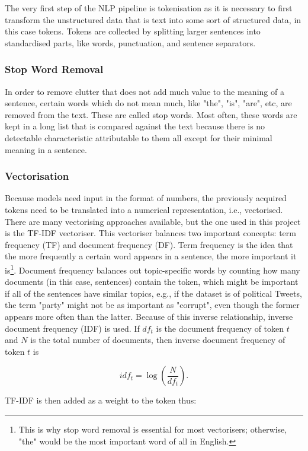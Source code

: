 \documentclass{l4proj}
\begin{document}
The very first step of the NLP pipeline is tokenisation as it is necessary to first transform the unstructured data that is text into some sort of structured data, in this case tokens. Tokens are collected by splitting larger sentences into standardised parts, like words, punctuation, and sentence separators.

\subsubsection{Stop Word Removal}

In order to remove clutter that does not add much value to the meaning of a sentence, certain words which do not mean much, like "the", "is", "are", etc, are removed from the text. These are called stop words. Most often, these words are kept in a long list that is compared against the text because there is no detectable characteristic attributable to them all except for their minimal meaning in a sentence.

\subsubsection{Vectorisation}

Because models need input in the format of numbers, the previously acquired tokens need to be translated into a numerical representation, i.e., vectorised. There are many vectorising approaches available, but the one used in this project is the TF-IDF vectoriser. This vectoriser balances two important concepts: term frequency (TF) and document frequency (DF). Term frequency is the idea that the more frequently a certain word appears in a sentence, the more important it is\footnote{This is why stop word removal is essential for most vectorisers; otherwise, "the" would be the most important word of all in English.}. Document frequency balances out topic-specific words by counting how many documents (in this case, sentences) contain the token, which might be important if all of the sentences have similar topics, e.g., if the dataset is of political Tweets, the term "party" might not be as important as "corrupt", even though the former appears more often than the latter. Because of this inverse relationship, inverse document frequency (IDF) is used. If $df_t$ is the document frequency of token $t$ and $N$ is the total number of documents, then inverse document frequency of token $t$ is

\[idf_t = \log(\frac{N}{df_t}).\]

TF-IDF is then added as a weight to the token thus:
\end{document}
